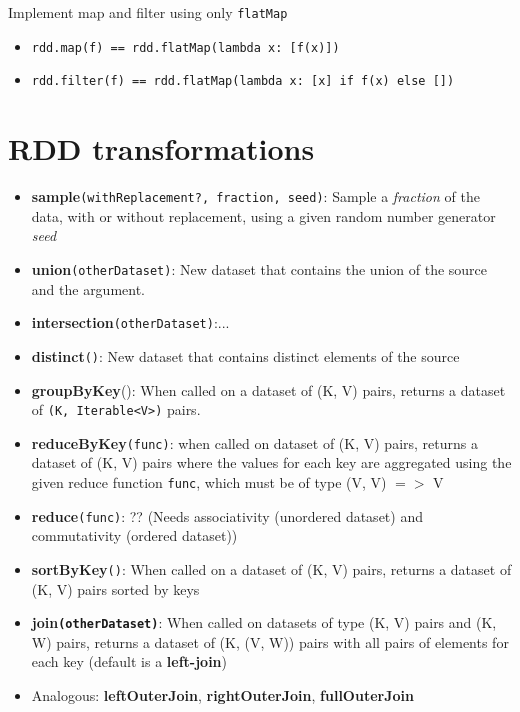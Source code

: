 \documentclass[11pt]{article}
\begin{document}
Implement map and filter using only \verb|flatMap|

\begin{itemize}
	\item \verb|rdd.map(f) == rdd.flatMap(lambda x: [f(x)])|
	\item \verb|rdd.filter(f) == rdd.flatMap(lambda x: [x] if f(x) else [])|
\end{itemize}

\section*{RDD transformations}

\begin{itemize}
	\item \textbf{sample}\verb|(withReplacement?, fraction, seed)|: Sample a \textit{fraction} of the data, with or without replacement, using a given random number generator \textit{seed}
	\item \textbf{union}\verb|(otherDataset)|: New dataset that contains the union of the source and the argument.
	\item \textbf{intersection}\verb|(otherDataset)|:...
	\item \textbf{distinct}\verb|()|: New dataset that contains distinct elements of the source
	\item \textbf{groupByKey}(): When called on a dataset of (K, V) pairs, returns a dataset of \verb|(K, Iterable<V>)| pairs.
	\item \textbf{reduceByKey}\verb|(func)|: when called on dataset of (K, V) pairs, returns a dataset of (K, V) pairs where the values for each key are aggregated using the given reduce function \verb|func|, which must be of type (V, V) $=>$ V
	\item \textbf{reduce}\verb|(func)|: ?? (Needs associativity (unordered dataset) and commutativity (ordered dataset))
	\item \textbf{sortByKey}\verb|()|: When called on a dataset of (K, V) pairs, returns a dataset of (K, V) pairs sorted by keys
	\item \textbf{join\verb|(otherDataset)|}: When called on datasets of type (K, V) pairs and (K, W) pairs, returns a dataset of (K, (V, W)) pairs with all pairs of elements for each key (default is a \textbf{left-join})
	\item Analogous: \textbf{leftOuterJoin}, \textbf{rightOuterJoin}, \textbf{fullOuterJoin}

\end{itemize}
\end{document}
